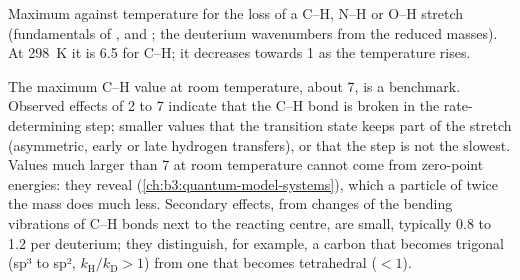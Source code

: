 \begin{omfigure}

{\small Maximum  against temperature for the loss
of a C--H, N--H or O--H stretch (fundamentals of ,  and ; the
deuterium wavenumbers from the reduced masses). At \qty{298}{K} it is 6.5 for C--H;
it decreases towards 1 as the temperature rises.}
\end{omfigure}

The maximum C--H value at room temperature, about 7, is a benchmark. Observed
effects of 2 to 7 indicate that the C--H bond is broken in the rate-determining
step; smaller values that the transition state keeps part of the stretch
(asymmetric, early or late hydrogen transfers), or that the step is not the
slowest. Values much larger than 7 at room temperature cannot come from
zero-point energies: they reveal  (\cref{ch:b3:quantum-model-systems}),
which a particle of twice the mass does much less. Secondary effects, from
changes of the bending vibrations of C--H bonds next to the reacting centre,
are small, typically 0.8 to 1.2 per deuterium; they distinguish, for example, a
carbon that becomes trigonal (sp³ to sp², $k_{\mathrm H}/k_{\mathrm D} > 1$) from one that becomes
tetrahedral ($< 1$).

